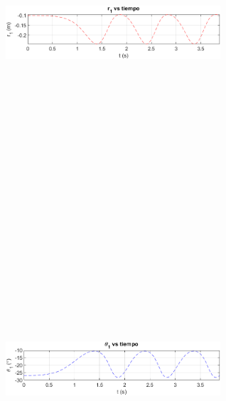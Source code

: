 \documentclass[12pt]{article}
\begin{document}
\begin{multicols}{2}
\begin{figure} [H]
        \centerline{\includegraphics[width=8cm, height=12cm,keepaspectratio]{NR Consecutivo/r1.png}}
    \end{figure}
    \vspace{-20pt}
        \begin{figure} [H]
        \centerline{\includegraphics[width=8cm, height=12cm,keepaspectratio]{NR Consecutivo/theta1.png}}

\end{figure}
\end{multicols}
\end{document}
